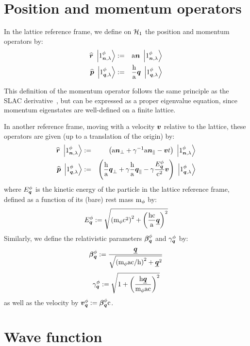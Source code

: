 \documentclass[10pt,a4paper,twoside,openany]{book}
\begin{document}
\section{Position and momentum operators}

 In the lattice reference frame, we define on $\Hn 1$ the position and momentum operators by:
\begin{eqnarray*}
\Rop \ketX 1 \pt \n \sp & \eqdef & \a \n \ketX 1 \pt \n \sp \\
\Pop \ketQ 1 \pt \q \sp & \eqdef & \frac \h \a \q \ketQ 1 \pt \q \sp
\end{eqnarray*}

 This definition of the momentum operator follows the same principle as the SLAC derivative~\cite{Rabin1981}, but can be expressed as a proper eigenvalue equation, since momentum eigenstates are well-defined on a finite lattice.

 In another reference frame, moving with a velocity $\sv v$ relative to the lattice, these operators are given (up to a translation of the origin) by:
\begin{eqnarray*}
\Rop \ketX 1 \pt \n \sp & \eqdef & \left( \a \n_\perp + \gamma^{-1} \a  \n_\parallel - \sv v t \right) \ketX 1 \pt \n \sp \\
\Pop \ketQ 1 \pt \q \sp & \eqdef & \left( \frac \h \a \q_\perp + \gamma \frac \h \a \q_\parallel - \gamma \frac {\Ek \pt \q} {\c^2} \sv v \right) \ketQ 1 \pt \q \sp
\end{eqnarray*}
where $\Ek \pt \q$ is the kinetic energy of the particle in the lattice reference frame, defined as a function of its (bare) rest mass $\mp \pt$ by:
\begin{equation*}
\Ek \pt \q \eqdef \sqrt{\left( \mp \pt \c^2 \right)^2 + \left( \frac{\h \c}{\a} \eqp \q \right)^2}
\end{equation*}
Similarly, we define the relativistic parameters $\bk \pt \q$ and $\gk \pt \q$ by:
\begin{equation*}
\bk \pt \q \eqdef \frac{\eqp \q}{\sqrt{\left( \mp \pt \a \c / \h \right)^2 + \eqp \q^2}}
\end{equation*}
\begin{equation*}
\gk \pt \q \eqdef \sqrt{1 + \left( \frac{\h \eqp \q}{\mp \pt \a \c} \right)^2}
\end{equation*}
as well as the velocity by $\vk \pt \q \eqdef \bk \pt \q \c$.

\section{Wave function}
\end{document}
